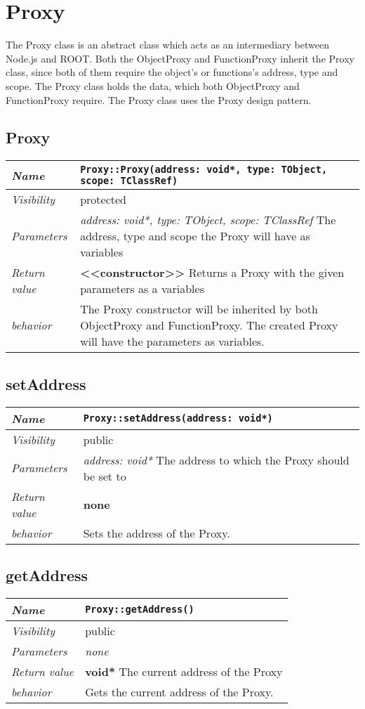 \chapter{Proxy}
The Proxy class is an abstract class which acts as an intermediary between Node.js and ROOT. Both the ObjectProxy and FunctionProxy inherit the Proxy class, since both of them require the object's or functions's address, type and scope. The Proxy class holds the data, which both ObjectProxy and FunctionProxy require. The Proxy class uses the Proxy design pattern.
\section{Proxy}
\begin{longtable}{p{3cm} @{\hskip 1cm} p{12cm}}
 \hline
\textit{Name} & \texttt{Proxy::Proxy(address: void*, type: TObject, scope: TClassRef)}\\
\hline
 \textit{Visibility} & protected\\
\hline
\textit{Parameters} & \textit{address: void*, type: TObject, scope: TClassRef} The address, type and scope the Proxy will have as variables \\
\hline
\textit{Return value} & \textbf{ <<constructor>>} Returns a Proxy with the given parameters as a variables \\
  \hline
 \textit{behavior} & The Proxy constructor will be inherited by both ObjectProxy and FunctionProxy.
 The created Proxy will have the parameters as variables. \\
\hline
\end{longtable} \pagebreak
 \section{setAddress}
\begin{longtable}{p{3cm} @{\hskip 1cm} p{12cm}}
 \hline
\textit{Name} & \texttt{Proxy::setAddress(address: void*)}\\
\hline
 \textit{Visibility} & public\\
\hline
\textit{Parameters} & \textit{address: void*} The address to which the Proxy should be set to \\
\hline
\textit{Return value} & \textbf{none}\\
  \hline
 \textit{behavior} & Sets the address of the Proxy. \\
\hline
\end{longtable} \pagebreak
 \section{getAddress}
\begin{longtable}{p{3cm} @{\hskip 1cm} p{12cm}}
 \hline
\textit{Name} & \texttt{Proxy::getAddress()}\\
\hline
 \textit{Visibility} & public\\
\hline
\textit{Parameters} & \textit{none}\\
\hline
\textit{Return value} & \textbf{ void*} The current address of the Proxy \\
  \hline
 \textit{behavior} & Gets the current address of the Proxy. \\
\hline
\end{longtable} \pagebreak
